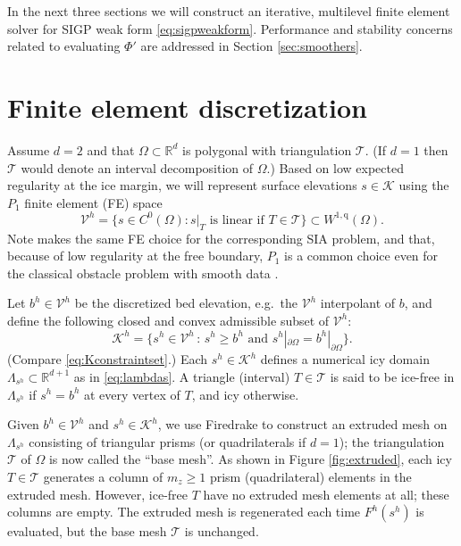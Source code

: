 \documentclass[letterpaper,final,12pt,reqno]{amsart}
\theoremstyle{claim}
\newcommand{\RR}{\mathbb{R}}
\newcommand{\qq}{{\text{q}}}
\numberwithin{equation}{section}
\numberwithin{figure}{section}
\numberwithin{table}{section}
\numberwithin{theorem}{section}
\begin{document}
In the next three sections we will construct an iterative, multilevel finite element solver for SIGP weak form \eqref{eq:sigpweakform}.  Performance and stability concerns related to evaluating $\Phi'$ are addressed in Section \ref{sec:smoothers}.


\section{Finite element discretization} \label{sec:fe}

Assume $d=2$ and that $\Omega \subset \RR^d$ is polygonal with triangulation $\mathcal{T}$.  (If $d=1$ then $\mathcal{T}$ would denote an interval decomposition of $\Omega$.)  Based on low expected regularity at the ice margin, we will represent surface elevations $s\in \mathcal{K}$ using the $P_1$ finite element (FE) space
\begin{equation}
\mathcal{V}^h = \{s \in C^0(\Omega) : s|_T \text{ is linear if } T \in \mathcal{T}\} \subset W^{1,\qq}(\Omega).
\end{equation}
Note \cite{JouvetBueler2012} makes the same FE choice for the corresponding SIA problem, and that, because of low regularity at the free boundary, $P_1$ is a common choice even for the classical obstacle problem with smooth data \cite{GraeserKornhuber2009}.

Let $b^h \in \mathcal{V}^h$ be the discretized bed elevation, e.g.~the $\mathcal{V}^h$ interpolant of $b$, and define the following closed and convex admissible subset of $\mathcal{V}^h$:
\begin{equation}
\mathcal{K}^h = \{s^h \in \mathcal{V}^h \,:\, s^h \ge b^h \text{ and } s^h|_{\partial\Omega} = b^h|_{\partial\Omega}\}.  \label{eq:feK}
\end{equation}
(Compare \eqref{eq:Kconstraintset}.)  Each $s^h\in \mathcal{K}^h$ defines a numerical icy domain $\Lambda_{s^h} \subset \RR^{d+1}$ as in \eqref{eq:lambdas}.  A triangle (interval) $T\in\mathcal{T}$ is said to be ice-free in $\Lambda_{s^h}$ if $s^h=b^h$ at every vertex of $T$, and icy otherwise.

Given $b^h \in \mathcal{V}^h$ and $s^h \in \mathcal{K}^h$, we use Firedrake to construct an extruded mesh \cite{McRaeetal2016} on $\Lambda_{s^h}$ consisting of triangular prisms (or quadrilaterals if $d=1$); the triangulation $\mathcal{T}$ of $\Omega$ is now called the ``base mesh''.  As shown in Figure \ref{fig:extruded}, each icy $T \in \mathcal{T}$ generates a column of $m_z \ge 1$ prism (quadrilateral) elements in the extruded mesh.  However, ice-free $T$ have no extruded mesh elements at all; these columns are empty.  The extruded mesh is regenerated each time $F^h(s^h)$ is evaluated, but the base mesh $\mathcal{T}$ is unchanged.
\end{document}
